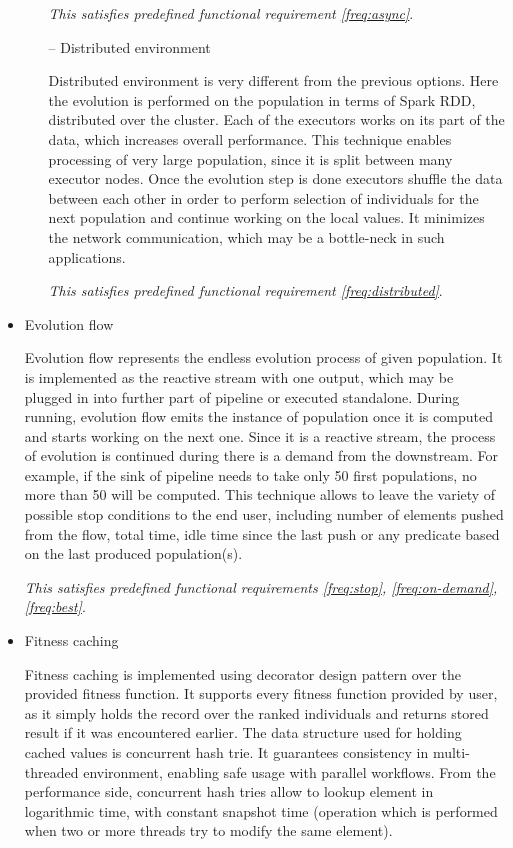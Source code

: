 \begin{itemize}
\begin{itemize}
\smallskip \textit{This satisfies predefined functional requirement \ref{freq:async}}.

\medbreak

\item[--]
Distributed environment

Distributed environment is very different from the previous options. Here the evolution is performed on the population in terms of Spark RDD, distributed over the cluster. Each of the executors works on its part of the data, which increases overall performance. This technique enables processing of very large population, since it is split between many executor nodes. Once the evolution step is done executors shuffle the data between each other in order to perform selection of individuals for the next population and continue working on the local values. It minimizes the network communication, which may be a bottle-neck in such applications. 

\smallskip\textit{This satisfies predefined functional requirement \ref{freq:distributed}}.

\end{itemize}
\medbreak

\item
Evolution flow

Evolution flow represents the endless evolution process of given population. It is implemented as the reactive stream with one output, which may be plugged in into further part of pipeline or executed standalone. During running, evolution flow emits the instance of population once it is computed and starts working on the next one. Since it is a reactive stream, the process of evolution is continued during there is a demand from the downstream. For example, if the sink of pipeline needs to take only 50 first populations, no more than 50 will be computed. This technique allows to leave the variety of possible stop conditions to the end user, including number of elements pushed from the flow, total time, idle time since the last push or any predicate based on the last produced population(s). 

\smallskip\textit{This satisfies predefined functional requirements \ref{freq:stop}, \ref{freq:on-demand}, \ref{freq:best}}.

\medbreak

\item Fitness caching

Fitness caching is implemented using decorator design pattern over the provided fitness function. It supports every fitness function provided by user, as it simply holds the record over the ranked individuals and returns stored result if it was encountered earlier. The data structure used for holding cached values is concurrent hash trie. It guarantees consistency in multi-threaded environment, enabling safe usage with parallel workflows. From the performance side, concurrent hash tries allow to lookup element in logarithmic time, with constant snapshot time \cite{hash_tries} (operation which is performed when two or more threads try to modify the same element).


\end{itemize}
